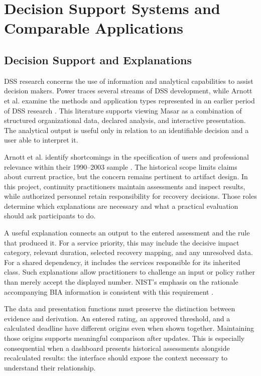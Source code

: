 \section{Decision Support Systems and Comparable Applications}
\label{sec:lr_dss}

\subsection{Decision Support and Explanations}
\label{sec:lr_dss_foundations}

DSS research concerns the use of information and analytical capabilities to assist decision makers. Power traces several streams of DSS development, while Arnott et al. examine the methods and application types represented in an earlier period of DSS research \cite{power2007history,arnott2005descriptive}. This literature supports viewing Masar as a combination of structured organizational data, declared analysis, and interactive presentation. The analytical output is useful only in relation to an identifiable decision and a user able to interpret it.

Arnott et al. identify shortcomings in the specification of users and professional relevance within their 1990--2003 sample \cite{arnott2005descriptive}. The historical scope limits claims about current practice, but the concern remains pertinent to artifact design. In this project, continuity practitioners maintain assessments and inspect results, while authorized personnel retain responsibility for recovery decisions. Those roles determine which explanations are necessary and what a practical evaluation should ask participants to do.

A useful explanation connects an output to the entered assessment and the rule that produced it. For a service priority, this may include the decisive impact category, relevant duration, selected recovery mapping, and any unresolved data. For a shared dependency, it includes the services responsible for its inherited class. Such explanations allow practitioners to challenge an input or policy rather than merely accept the displayed number. NIST's emphasis on the rationale accompanying BIA information is consistent with this requirement \cite{quinn2025bia}.

The data and presentation functions must preserve the distinction between evidence and derivation. An entered rating, an approved threshold, and a calculated deadline have different origins even when shown together. Maintaining those origins supports meaningful comparison after updates. This is especially consequential when a dashboard presents historical assessments alongside recalculated results: the interface should expose the context necessary to understand their relationship.

